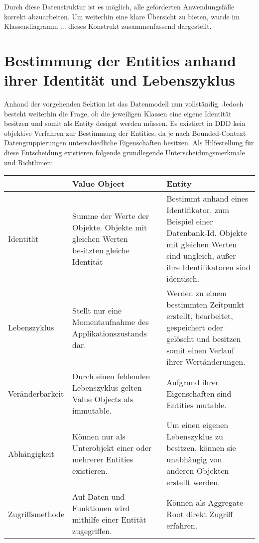
Durch diese Datenstruktur ist es möglich, alle geforderten Anwendungsfälle korrekt abzuarbeiten. Um weiterhin eine klare Übersicht zu bieten, wurde im Klassendiagramm ... dieses Konstrukt zusammenfassend dargestellt.


\section{Bestimmung der Entities anhand ihrer Identität und Lebenszyklus}

Anhand der vorgehenden Sektion ist das Datenmodell nun vollständig. Jedoch besteht weiterhin die Frage, ob die jeweiligen Klassen eine eigene Identität besitzen und somit als Entity designt werden müssen. Es existiert in DDD kein objektive Verfahren zur Bestimmung der Entities, da je nach Bounded-Context Datengruppierungen unterschiedliche Eigenschaften besitzen. Als Hilfestellung für diese Entscheidung existieren folgende grundlegende Unterscheidungsmerkmale und Richtlinien:

\begin{tabular}{ | p{} | p{} | p{} | } 
	\hline
	& {\textbf{\centering Value Object} } & \textbf{\centering Entity} \\ 
	\hline
	Identität & 
	Summe der Werte der Objekte. Objekte mit gleichen Werten besitzten gleiche Identität & 
	Bestimmt anhand eines Identifikator, zum Beispiel einer Datenbank-Id. Objekte mit gleichen Werten sind ungleich, außer ihre Identifikatoren sind identisch. \\ 
	\hline
	Lebenszyklus & 
	Stellt nur eine Momentaufnahme des Applikationszustands dar. &
	Werden zu einem bestimmten Zeitpunkt erstellt, bearbeitet, gespeichert oder gelöscht und besitzen somit einen Verlauf ihrer Wertänderungen.  \\ 
	\hline
	Veränderbarkeit & 
	Durch einen fehlenden Lebenszyklus gelten Value Objects als immutable. &
	Aufgrund ihrer Eigenschaften sind Entities mutable.  \\ 
	\hline
	Abhängigkeit & 
	Können nur als Unterobjekt einer oder mehrerer Entities existieren. &
	Um einen eigenen Lebenszyklus zu besitzen, können sie unabhängig von anderen Objekten erstellt werden.  \\ 
	\hline
	Zugriffsmethode & 
	Auf Daten und Funktionen wird mithilfe einer Entität zugegriffen. &
	Können als Aggregate Root direkt Zugriff erfahren. \\ 
	\hline
\end{tabular}

